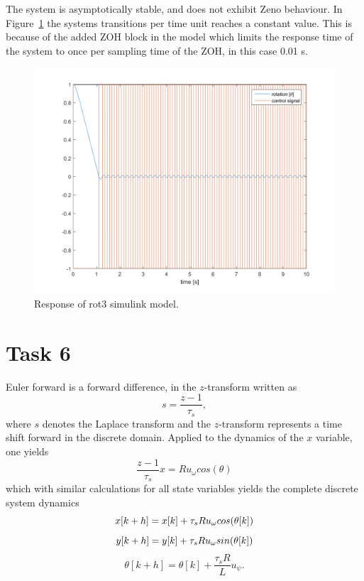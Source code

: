 \documentclass[a4paper,12pt,oneside,onecolumn]{article} %
\begin{document}
	The system is asymptotically stable, and does not exhibit Zeno behaviour. In Figure~\ref{fig:task5_plot} the systems transitions per time unit reaches a constant value. This is because of the added ZOH block in the model which limits the response time of the system to once per sampling time of the ZOH, in this case 0.01 s.
	\begin{figure}[H]
        \centering
        \includegraphics[scale = 0.5, width=1\linewidth]{../matlab/images/task5_plot.png}
        \caption{Response of rot3 simulink model.}
        \label{fig:task5_plot}
    \end{figure}

\section*{Task 6}

Euler forward is a forward difference, in the $z$-transform written as
\begin{equation}
s = \frac{z-1}{\tau_s},
\end{equation}
where $s$ denotes the Laplace transform and the $z$-transform represents a time shift forward in the discrete domain. Applied to the dynamics of the $x$ variable, one yields
\begin{equation}
\frac{z-1}{\tau_s}x=Ru_\omega cos(\theta)
\end{equation}
which with similar calculations for all state variables yields the complete discrete system dynamics
\begin{equation}
x[k+h] = x[k] + \tau_s R u_\omega cos(\theta [k])	\\
\end{equation}
\begin{equation}
y[k+h] = y[k] + \tau_s R u_\omega sin(\theta [k]) \\
\end{equation}
\begin{equation}
\label{thetadynamics}
\theta[k+h] = \theta [k] + \frac{\tau_s R}{L} u_\psi.
\end{equation}
\end{document}

